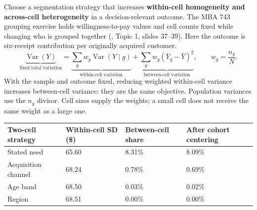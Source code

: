 \documentclass[10pt]{article}
\begin{document}
Choose a segmentation strategy that increases \textbf{within-cell homogeneity and across-cell heterogeneity} in a decision-relevant outcome. The MBA 743 grouping exercise holds willingness-to-pay values and cell counts fixed while changing who is grouped together (, Topic 1, slides 37--39). Here the outcome is six-receipt contribution per originally acquired customer.
\[
\underbrace{\operatorname{Var}(Y)}_{\text{fixed total variation}}
=\underbrace{\sum_g w_g\operatorname{Var}(Y\mid g)}_{\text{within-cell variation}}
+\underbrace{\sum_g w_g(\bar Y_g-\bar Y)^2}_{\text{between-cell variation}},
\qquad w_g=\frac{n_g}{N}.
\]
With the sample and outcome fixed, reducing weighted within-cell variance increases between-cell variance: they are the same objective. Population variances use the $n_g$ divisor. Cell sizes supply the weights; a small cell does not receive the same weight as a large one.
{\fontsize{8.5}{10.5}\selectfont \par\begin{tabularx}{\linewidth}{@{}p{.28\linewidth}YYY@{}}\toprule
\textbf{Two-cell strategy} & \textbf{Within-cell SD (\$)} & \textbf{Between-cell share} & \textbf{After cohort centering}\\\midrule
Stated need & 65.60 & 8.31\% & 8.09\%\\
Acquisition channel & 68.24 & 0.78\% & 0.69\%\\
Age band & 68.50 & 0.03\% & 0.02\%\\
Region & 68.51 & 0.00\% & 0.00\%\\
\bottomrule\end{tabularx}\par}
\end{document}
